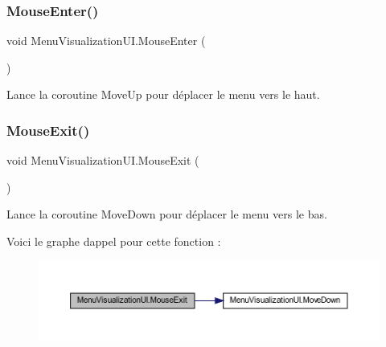 \subsubsection{\texorpdfstring{Mouse\+Enter()}{MouseEnter()}}
{\footnotesize\ttfamily void Menu\+Visualization\+U\+I.\+Mouse\+Enter (\begin{DoxyParamCaption}{ }\end{DoxyParamCaption})\hspace{0.3cm}{\ttfamily [inline]}}



Lance la coroutine Move\+Up pour déplacer le menu vers le haut. 

\mbox{\label{class_menu_visualization_u_i_a47ce6ce3497846e9048582985fc3d8be}} 
\subsubsection{\texorpdfstring{Mouse\+Exit()}{MouseExit()}}
{\footnotesize\ttfamily void Menu\+Visualization\+U\+I.\+Mouse\+Exit (\begin{DoxyParamCaption}{ }\end{DoxyParamCaption})\hspace{0.3cm}{\ttfamily [inline]}}



Lance la coroutine Move\+Down pour déplacer le menu vers le bas. 

Voici le graphe d\textquotesingle{}appel pour cette fonction \+:
\nopagebreak
\begin{figure}[H]
\begin{center}
\leavevmode
\includegraphics[width=350pt]{class_menu_visualization_u_i_a47ce6ce3497846e9048582985fc3d8be_cgraph}
\end{center}
\end{figure}
\mbox{\label{class_menu_visualization_u_i_a65d11fcd4e858cf3bb0c4fdc95128030}} 
